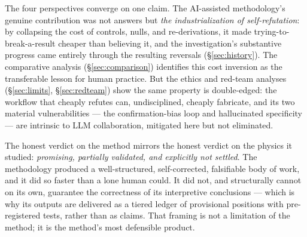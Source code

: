 \documentclass[11pt]{article}
\begin{document}
The four perspectives converge on one claim. The AI-assisted methodology's genuine contribution was not answers but \emph{the industrialization of self-refutation}: by collapsing the cost of controls, nulls, and re-derivations, it made trying-to-break-a-result cheaper than believing it, and the investigation's substantive progress came entirely through the resulting reversals (\S\ref{sec:history}). The comparative analysis (\S\ref{sec:comparison}) identifies this cost inversion as the transferable lesson for human practice. But the ethics and red-team analyses (\S\ref{sec:limits}, \S\ref{sec:redteam}) show the same property is double-edged: the workflow that cheaply refutes can, undisciplined, cheaply fabricate, and its two material vulnerabilities --- the confirmation-bias loop and hallucinated specificity --- are intrinsic to LLM collaboration, mitigated here but not eliminated.

The honest verdict on the method mirrors the honest verdict on the physics it studied: \emph{promising, partially validated, and explicitly not settled}. The methodology produced a well-structured, self-corrected, falsifiable body of work, and it did so faster than a lone human could. It did not, and structurally cannot on its own, guarantee the correctness of its interpretive conclusions --- which is why its outputs are delivered as a tiered ledger of provisional positions with pre-registered tests, rather than as claims. That framing is not a limitation of the method; it is the method's most defensible product.
\end{document}
